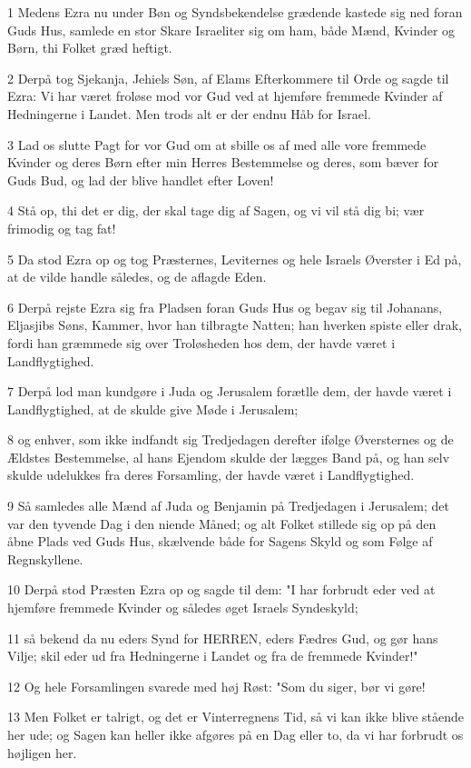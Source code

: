 \par 1 Medens Ezra nu under Bøn og Syndsbekendelse grædende kastede sig ned foran Guds Hus, samlede en stor Skare Israeliter sig om ham, både Mænd, Kvinder og Børn, thi Folket græd heftigt.
\par 2 Derpå tog Sjekanja, Jehiels Søn, af Elams Efterkommere til Orde og sagde til Ezra: Vi har været froløse mod vor Gud ved at hjemføre fremmede Kvinder af Hedningerne i Landet. Men trods alt er der endnu Håb for Israel.
\par 3 Lad os slutte Pagt for vor Gud om at sbille os af med alle vore fremmede Kvinder og deres Børn efter min Herres Bestemmelse og deres, som bæver for Guds Bud, og lad der blive handlet efter Loven!
\par 4 Stå op, thi det er dig, der skal tage dig af Sagen, og vi vil stå dig bi; vær frimodig og tag fat!
\par 5 Da stod Ezra op og tog Præsternes, Leviternes og hele Israels Øverster i Ed på, at de vilde handle således, og de aflagde Eden.
\par 6 Derpå rejste Ezra sig fra Pladsen foran Guds Hus og begav sig til Johanans, Eljasjibs Søns, Kammer, hvor han tilbragte Natten; han hverken spiste eller drak, fordi han græmmede sig over Troløsheden hos dem, der havde været i Landflygtighed.
\par 7 Derpå lod man kundgøre i Juda og Jerusalem forætlle dem, der havde været i Landflygtighed, at de skulde give Møde i Jerusalem;
\par 8 og enhver, som ikke indfandt sig Tredjedagen derefter ifølge Øversternes og de Ældstes Bestemmelse, al hans Ejendom skulde der lægges Band på, og han selv skulde udelukkes fra deres Forsamling, der havde været i Landflygtighed.
\par 9 Så samledes alle Mænd af Juda og Benjamin på Tredjedagen i Jerusalem; det var den tyvende Dag i den niende Måned; og alt Folket stillede sig op på den åbne Plads ved Guds Hus, skælvende både for Sagens Skyld og som Følge af Regnskyllene.
\par 10 Derpå stod Præsten Ezra op og sagde til dem: "I har forbrudt eder ved at hjemføre fremmede Kvinder og således øget Israels Syndeskyld;
\par 11 så bekend da nu eders Synd for HERREN, eders Fædres Gud, og gør hans Vilje; skil eder ud fra Hedningerne i Landet og fra de fremmede Kvinder!"
\par 12 Og hele Forsamlingen svarede med høj Røst: "Som du siger, bør vi gøre!
\par 13 Men Folket er talrigt, og det er Vinterregnens Tid, så vi kan ikke blive stående her ude; og Sagen kan heller ikke afgøres på en Dag eller to, da vi har forbrudt os højligen her.

